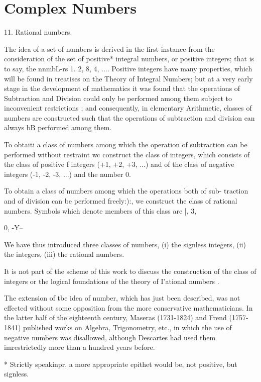\chapter{Complex Numbers} 

11. Rational numbers. 

The idea of a set of numbers is derived in the first instance from the 
consideration of the set of positive* integral numbers, or positive integers; 
that is to say, the nnmbL-rs 1. 2, 8, 4, .... Positive integers have many 
properties, which will be found in treatises on the Theory of Integral 
Numbers; but at a very early stage in the development of mathematics 
it was found that the operations of Subtraction and Division could only be 
performed among them subject to inconvenient restrictions ; and consequently, 
in elementary Arithmetic, classes of numbers are constructed such that the 
operations of subtraction and division can always bB performed among them. 

To obtaiti a class of numbers among which the operation of subtraction 
can be performed without restraint wc construct the class of integers, which 
consists of the class of positive f integers (+1, +2, +3, ...) and of the class 
of negative integers (-1, -2, -3, ...) and the number 0. 

To obtain a class of numbers among which the operations both of sub- 
traction and of division can be performed freely:):, we construct the class of 
rational numbers. Symbols which denote members of this class are |, 3, 

0, -Y-- 

We have thus introduced three classes of numbers, (i) the signless integers, 
(ii) the integers, (iii) the rational numbers. 

It is not part of the scheme of this work to discuss the construction of 
the class of integers or the logical foundations of the theory of I'ational 
numbers . 

The extension of tbe idea of number, which has just been described, was not effected 
without some opposition from the more conservative mathematicians. In the latter half 
of the eighteenth century, Maseras (1731-1824) and Frend (1757-1841) published works 
on Algebra, Trigonometry, etc., in which the use of negative numbers was disallowed, 
although Descartes had used them imrestrictedly more than a hundred years before. 

* Strictly speakinpr, a more appropriate epithet would be, not positive, but signless. 

